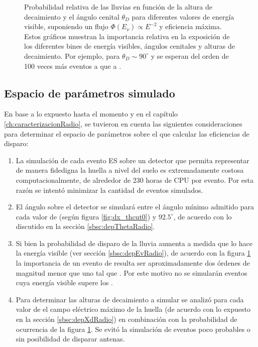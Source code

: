 \begin{figure}[ht!]
		\caption{\label{fig:radioShWeights}
		Probabilidad relativa  de las lluvias en funci\'on de la altura de decaimiento \xd{} y el \'angulo cenital $\theta_D$ para diferentes valores de energ\'ia visible, suponiendo un flujo $\Phi(E_\nu)\propto E^{-2}$ y eficiencia m\'axima.
		Estos gr\'aficos muestran la importancia relativa en la exposici\'on de los diferentes bines de energ\'ia visibles, \'angulos cenitales y alturas de decaimiento.
 		Por ejemplo, para $\theta_D\sim90^\circ$ y  se esperan del orden de 100 veces m\'as eventos a  que a .
		}
	\end{figure}
	
	\subsection{Espacio de par\'ametros simulado}
	
	En base a lo expuesto hasta el momento y en el cap\'itulo \ref{ch:caracterizacionRadio}, se tuvieron en cuenta las siguientes consideraciones para determinar el espacio de par\'ametros sobre el que calcular las eficiencias de disparo:
	\begin{enumerate}
		\item La simulaci\'on de cada evento ES sobre un detector que permita representar de manera fidedigna la huella a nivel del suelo es extremadamente costosa computacionalmente, de alrededor de 230 horas de CPU por evento.
		Por esta raz\'on se intent\'o minimizar la cantidad de eventos simulados.
		\item El \'angulo sobre el detector se simular\'a entre el \'angulo m\'inimo admitido para cada valor de \xd{} (seg\'un figura \ref{fig:dx_thcut0}) y $92.5^\circ$, de acuerdo con lo discutido en la secci\'on \ref{sbsc:depThetaRadio}.
		\item Si bien la probabilidad de disparo de la lluvia aumenta a medida que lo hace la energ\'ia visible (ver secci\'on \ref{sbsc:depEvRadio}), de acuerdo con la figura \ref{fig:radioShWeights} la importancia de un evento de  resulta ser aproximadamente dos \'ordenes de magnitud menor que uno tal que . Por este motivo no se simular\'an eventos cuya energ\'ia visible supere los . 
		\item Para determinar las alturas de decaimiento a simular se analiz\'o para cada valor de \ev{} el campo el\'ectrico m\'aximo de la huella (de acuerdo con lo expuesto en la secci\'on \ref{sbsc:depXdRadio}) en combinaci\'on con la probabilidad de ocurrencia de la figura \ref{fig:radioShWeights}. Se evit\'o la simulaci\'on de eventos poco probables o sin posibilidad de disparar antenas.
	\end{enumerate}
	

